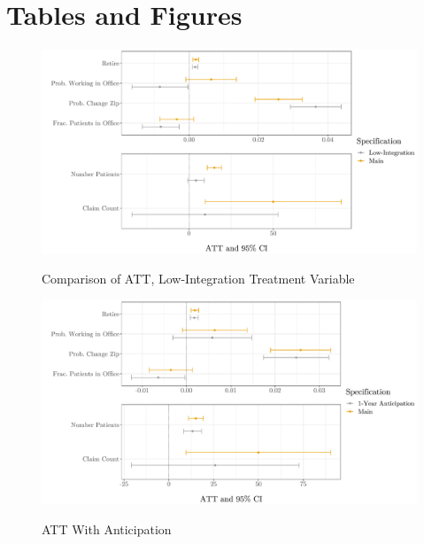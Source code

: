 \documentclass[11pt]{article}
\begin{document}
\clearpage

\section{Tables and Figures}

\begin{figure}[ht]
    \centering
    \caption{Comparison of ATT, Low-Integration Treatment Variable}
    \includegraphics[scale=.57]{Objects/LI_graph.pdf}
    \label{fig:LI}
\end{figure}

\begin{figure}[ht]
    \centering
    \caption{ATT With Anticipation}
    \includegraphics[scale=.57]{Objects/anticipation_graph.pdf}
    \label{fig:anticipation}
\end{figure}
\end{document}
